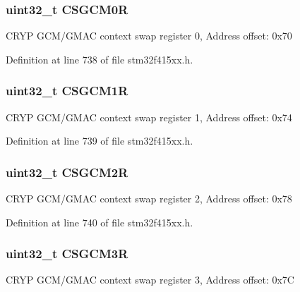 \subsubsection[{\texorpdfstring{C\+S\+G\+C\+M0R}{CSGCM0R}}]{ uint32\+\_\+t C\+S\+G\+C\+M0R}\hypertarget{struct_c_r_y_p___type_def_a86cedb899090e8aef940416daf0a46f3}{}\label{struct_c_r_y_p___type_def_a86cedb899090e8aef940416daf0a46f3}
C\+R\+YP G\+C\+M/\+G\+M\+AC context swap register 0, Address offset\+: 0x70 

Definition at line 738 of file stm32f415xx.\+h.

\subsubsection[{\texorpdfstring{C\+S\+G\+C\+M1R}{CSGCM1R}}]{ uint32\+\_\+t C\+S\+G\+C\+M1R}\hypertarget{struct_c_r_y_p___type_def_a4d92778e6e002275a9b91b834c2d2c46}{}\label{struct_c_r_y_p___type_def_a4d92778e6e002275a9b91b834c2d2c46}
C\+R\+YP G\+C\+M/\+G\+M\+AC context swap register 1, Address offset\+: 0x74 

Definition at line 739 of file stm32f415xx.\+h.

\subsubsection[{\texorpdfstring{C\+S\+G\+C\+M2R}{CSGCM2R}}]{ uint32\+\_\+t C\+S\+G\+C\+M2R}\hypertarget{struct_c_r_y_p___type_def_ae3b1773a8fb146591fcbb48e32c1834a}{}\label{struct_c_r_y_p___type_def_ae3b1773a8fb146591fcbb48e32c1834a}
C\+R\+YP G\+C\+M/\+G\+M\+AC context swap register 2, Address offset\+: 0x78 

Definition at line 740 of file stm32f415xx.\+h.

\subsubsection[{\texorpdfstring{C\+S\+G\+C\+M3R}{CSGCM3R}}]{ uint32\+\_\+t C\+S\+G\+C\+M3R}\hypertarget{struct_c_r_y_p___type_def_a13e161a9d71fc723979c06fe4e6e5bf5}{}\label{struct_c_r_y_p___type_def_a13e161a9d71fc723979c06fe4e6e5bf5}
C\+R\+YP G\+C\+M/\+G\+M\+AC context swap register 3, Address offset\+: 0x7C 

